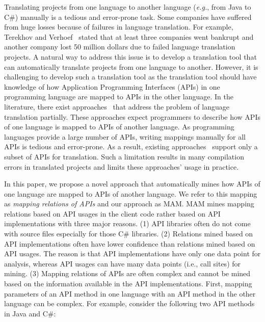 Translating projects from one language to another language
(\emph{e.g.}, from Java to C\#) manually is a tedious and
error-prone task. Some companies have suffered from huge losses because
of failures in language translation. For example, Terekhov and
Verhoef~\cite{terekhov2000realities} stated that at least three
companies went bankrupt and another company lost 50 million dollars
due to failed language translation projects. A natural way to
address this issue is to develop a translation tool that can
automatically translate projects from one language to another.
However, it is challenging to develop such a translation tool as the
translation tool should have knowledge of how Application
Programming Interfaces (APIs) in one programming
language are mapped to APIs in the other language. In the literature, there exist
approaches~\cite{mossienko2003automated, yasumatsu1995spice,hassan2005lightweight} that address the problem of language
translation partially. These approaches expect programmers to
describe how APIs of one language is mapped to APIs of another
language.  As programming languages provide a large number of APIs,
writing mappings manually for all APIs is tedious and error-prone.
As a result, existing approaches~\cite{mossienko2003automated,yasumatsu1995spice,hassan2005lightweight}
support only a subset of APIs for translation. Such a limitation
results in many compilation errors in translated projects and limits
these approaches' usage in practice.

In this paper, we propose a novel approach that automatically mines
how APIs of one language are mapped to APIs of another language. We
refer to this mapping as \emph{mapping relations of APIs} and our
approach as MAM. MAM mines mapping relations based on API usages in
the client code rather based on API implementations with three major
reasons. (1) API libraries often do not come with source files
especially for those C\# libraries. (2) Relations mined based on API
implementations often have lower confidence than relations mined
based on API usages. The reason is that API implementations have
only one data point for analysis, whereas API usages can have many
data points (i.e., call sites) for mining. (3) Mapping relations of
APIs are often complex and cannot be mined based on the information
available in the API implementations. First, mapping parameters of
an API method in one language with an API method in the other
language can be complex. For example, consider the following two API
methods in Java and C\#:

